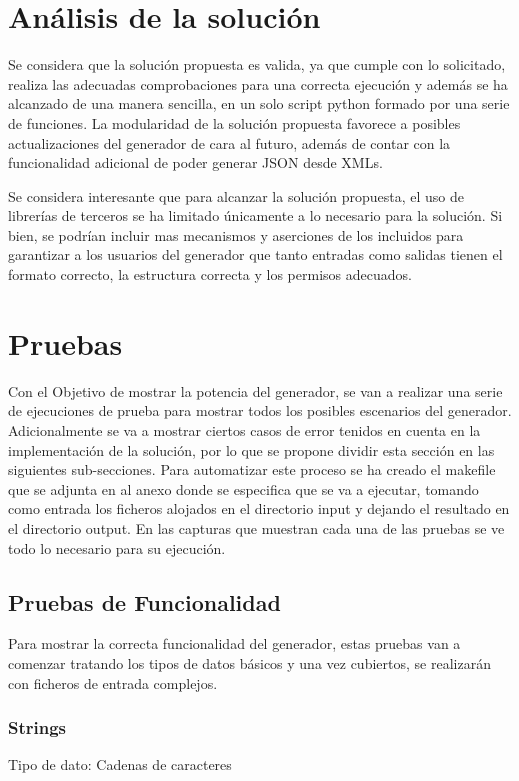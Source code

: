 \documentclass[a4paper,11pt]{book}
\begin{document}
\section{Análisis de la solución}

	Se considera que la solución propuesta es valida, ya que cumple con lo solicitado, realiza las adecuadas comprobaciones para una correcta ejecución y además se ha alcanzado de una manera sencilla, en un solo script python formado por una serie de funciones. La modularidad de la solución propuesta favorece a posibles actualizaciones del generador de cara al futuro, además de contar con la funcionalidad adicional de poder generar JSON desde XMLs. 

Se considera interesante que para alcanzar la solución propuesta, el uso de librerías de terceros se ha limitado únicamente a lo necesario para la solución. Si bien, se podrían incluir mas mecanismos y aserciones de los incluidos para garantizar a los usuarios del generador que tanto entradas como salidas tienen el formato correcto, la estructura correcta y los permisos adecuados. 
 
\section{Pruebas}

Con el Objetivo de mostrar la potencia del generador, se van a realizar una serie de ejecuciones de prueba para mostrar todos los posibles escenarios del generador. Adicionalmente se va a mostrar ciertos casos de error tenidos en cuenta en la implementación de la solución, por lo que se propone dividir esta sección en las siguientes sub-secciones. Para automatizar este proceso se ha creado el makefile que se adjunta en al anexo donde se especifica que se va a ejecutar, tomando como entrada los ficheros alojados en el directorio input y dejando el resultado en el directorio output. En las capturas que muestran cada una de las pruebas se ve todo lo necesario para su ejecución.  

\subsection{Pruebas de Funcionalidad}
Para mostrar la correcta funcionalidad del generador, estas pruebas van a comenzar tratando los tipos de datos básicos y una vez cubiertos, se realizarán con ficheros de entrada complejos. 

\subsubsection{Strings}
Tipo de dato: Cadenas de caracteres
\end{document}

